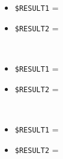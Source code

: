 \documentclass[../../SperimentazioniPratiche.tex]{subfiles}
\begin{document}
\begin{tcolorbox}[fonttitle=\bfseries, 
								adjusted title={\Large Prova 12A.1}, 
								breakable, 
								sharp corners=south,
								colback=white, 
								colframe=white!60!black]
\begin{description}[leftmargin=0.7cm,labelwidth=!]
					\tcbline        				
        				
        			\item[Output riscontrato] \ \par
        				\begin{description}
        				
        					\item[\dispositivoA] \ \par
        					\begin{itemize}
        						\item \verb|$RESULT1| = \ok
        						\item \verb|$RESULT2| = \ok
        					\end{itemize}      					
        					
        					\item[\dispositivoB] \ \par
        					\begin{itemize}
        						\item \verb|$RESULT1| = \ok
        						\item \verb|$RESULT2| = \ok
        					\end{itemize}
        					
        					\item[\dispositivoC] \ \par
        					\begin{itemize}
        						\item \verb|$RESULT1| = \ok
        						\item \verb|$RESULT2| = \ok
        					\end{itemize}
        					
        				\end{description}
        				
				\end{description}  
				
			\end{tcolorbox}



	
	\newpage	
\end{document}
